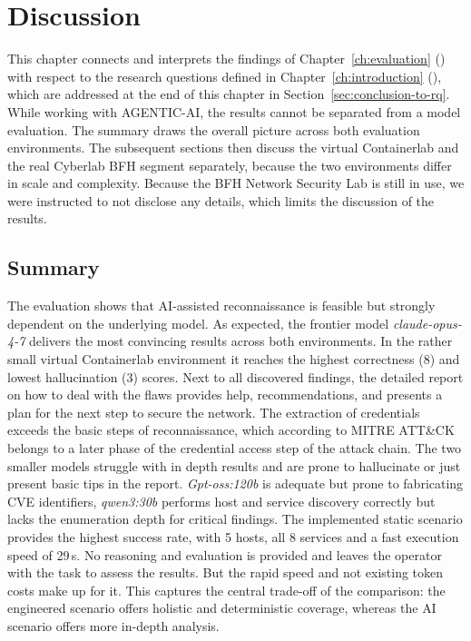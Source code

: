 
\chapter{Discussion}\label{ch:discussion}

This chapter connects and interprets the findings of Chapter~\ref{ch:evaluation} ()
with respect to the research questions defined in Chapter~\ref{ch:introduction} (), which are
addressed at the end of this chapter in Section~\ref{sec:conclusion-to-rq}.
While working with \gls{AGENTIC-AI}, the results cannot be separated from a model evaluation.
The summary draws the overall picture across both evaluation environments.
The subsequent sections then discuss the virtual \gls{Containerlab} and the real Cyberlab BFH
segment separately, because the two environments differ in scale and complexity.
Because the BFH Network Security Lab is still in use, we were instructed to not disclose any details,
which limits the discussion of the results.


\section{Summary}\label{sec:discussion-summary}
The evaluation shows that \gls{AI}-assisted reconnaissance is feasible but strongly
dependent on the underlying model.
As expected, the frontier model \textit{claude-opus-4-7} delivers the most convincing results
across both environments.
In the rather small virtual \gls{Containerlab} environment it reaches the highest correctness (8)
and lowest hallucination (3) scores.
Next to all discovered findings, the detailed report on how to deal with the flaws provides help, recommendations,
and presents a plan for the next step to secure the network.
The extraction of credentials exceeds the basic steps of reconnaissance, which according to MITRE ATT\&CK~\cite{mitreattack}
belongs to a later phase of the credential access step of the attack chain.
The two smaller models struggle with in depth results and are prone to hallucinate or just present basic tips in the report.
\textit{Gpt-oss:120b} is adequate but prone to fabricating \gls{CVE} identifiers,
\textit{qwen3:30b} performs host and service discovery correctly but lacks the enumeration depth for critical findings.
The implemented static scenario provides the highest success rate, with 5 hosts, all 8 services and a fast execution speed of 29\,s.
No reasoning and evaluation is provided and leaves the operator with the task to assess the results.
But the rapid speed and not existing token costs make up for it.
This captures the central trade-off of the comparison: the engineered scenario offers
holistic and deterministic coverage, whereas the \gls{AI} scenario offers more in-depth analysis.

